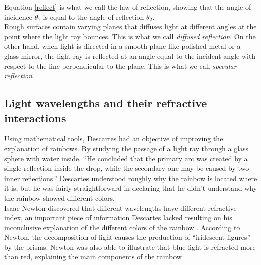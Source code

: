 \documentclass[a4paper,12pt]{article}
\begin{document}
Equation \eqref{reflect} is what we call the law of reflection, showing that the angle of incidence $\theta_1$ is equal to the angle of reflection $\theta_2$.\\

Rough surfaces contain varying planes that diffuses light at different angles at the point where the light ray bounces. This is what we call {\itshape diffused reflection}.  On the other hand, when light is directed in a smooth plane like polished metal or a glass mirror, the light ray is reflected at an angle equal to the incident angle with respect to the line perpendicular to the plane. This is what we call {\itshape specular reflection}

\subsection{Light wavelengths and their refractive interactions} \label{indices}


Using mathematical tools, Descartes had an objective of improving the explanation of rainbows. By studying the passage of a light ray through a glass sphere with water inside. “He concluded that the primary arc was created by a single reflection inside the drop, while the secondary one may be caused by two inner reflections.” \cite[9]{corradi16} Descartes understood roughly why the rainbow is located where it is, but he was fairly straightforward in declaring that he didn't understand why the rainbow showed different colors. \\

Isaac Newton discovered that different wavelengths have different refractive index, an important piece of information Descartes lacked resulting on his inconclusive explanation of the different colors of the rainbow \cite{casselman09}. According to Newton, the decomposition of light causes the production of “iridescent figures” by the prisms. Newton was also able to illustrate that blue light is refracted more than red, explaining the main components of the rainbow \cite[9]{corradi16}.
\end{document}
